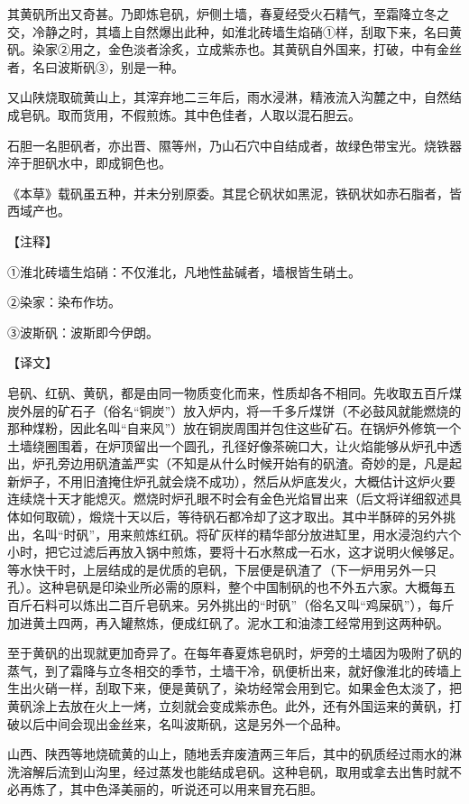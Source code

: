 \documentclass[12pt,UTF8]{ctexbook}
\begin{document}
其黄矾所出又奇甚。乃即炼皂矾，炉侧土墙，春夏经受火石精气，至霜降立冬之交，冷静之时，其墙上自然爆出此种，如淮北砖墙生焰硝①样，刮取下来，名曰黄矾。染家②用之，金色淡者涂炙，立成紫赤也。其黄矾自外国来，打破，中有金丝者，名曰波斯矾③，别是一种。

又山陕烧取硫黄山上，其滓弃地二三年后，雨水浸淋，精液流入沟麓之中，自然结成皂矾。取而货用，不假煎炼。其中色佳者，人取以混石胆云。

石胆一名胆矾者，亦出晋、隰等州，乃山石穴中自结成者，故绿色带宝光。烧铁器淬于胆矾水中，即成铜色也。

《本草》载矾虽五种，并未分别原委。其昆仑矾状如黑泥，铁矾状如赤石脂者，皆西域产也。

【注释】

①淮北砖墙生焰硝：不仅淮北，凡地性盐碱者，墙根皆生硝土。

②染家：染布作坊。

③波斯矾：波斯即今伊朗。

【译文】

皂矾、红矾、黄矾，都是由同一物质变化而来，性质却各不相同。先收取五百斤煤炭外层的矿石子（俗名“铜炭”）放入炉内，将一千多斤煤饼（不必鼓风就能燃烧的那种煤粉，因此名叫“自来风”）放在铜炭周围并包住这些矿石。在锅炉外修筑一个土墙绕圈围着，在炉顶留出一个圆孔，孔径好像茶碗口大，让火焰能够从炉孔中透出，炉孔旁边用矾渣盖严实（不知是从什么时候开始有的矾渣。奇妙的是，凡是起新炉子，不用旧渣掩住炉孔就会烧不成功），然后从炉底发火，大概估计这炉火要连续烧十天才能熄灭。燃烧时炉孔眼不时会有金色光焰冒出来（后文将详细叙述具体如何取硫），煅烧十天以后，等待矾石都冷却了这才取出。其中半酥碎的另外挑出，名叫“时矾”，用来煎炼红矾。将矿灰样的精华部分放进缸里，用水浸泡约六个小时，把它过滤后再放入锅中煎炼，要将十石水熬成一石水，这才说明火候够足。等水快干时，上层结成的是优质的皂矾，下层便是矾渣了（下一炉用另外一只孔）。这种皂矾是印染业所必需的原料，整个中国制矾的也不外五六家。大概每五百斤石料可以炼出二百斤皂矾来。另外挑出的“时矾”（俗名又叫“鸡屎矾”），每斤加进黄土四两，再入罐熬炼，便成红矾了。泥水工和油漆工经常用到这两种矾。

至于黄矾的出现就更加奇异了。在每年春夏炼皂矾时，炉旁的土墙因为吸附了矾的蒸气，到了霜降与立冬相交的季节，土墙干冷，矾便析出来，就好像淮北的砖墙上生出火硝一样，刮取下来，便是黄矾了，染坊经常会用到它。如果金色太淡了，把黄矾涂上去放在火上一烤，立刻就会变成紫赤色。此外，还有外国运来的黄矾，打破以后中间会现出金丝来，名叫波斯矾，这是另外一个品种。

山西、陕西等地烧硫黄的山上，随地丢弃废渣两三年后，其中的矾质经过雨水的淋洗溶解后流到山沟里，经过蒸发也能结成皂矾。这种皂矾，取用或拿去出售时就不必再炼了，其中色泽美丽的，听说还可以用来冒充石胆。
\end{document}
